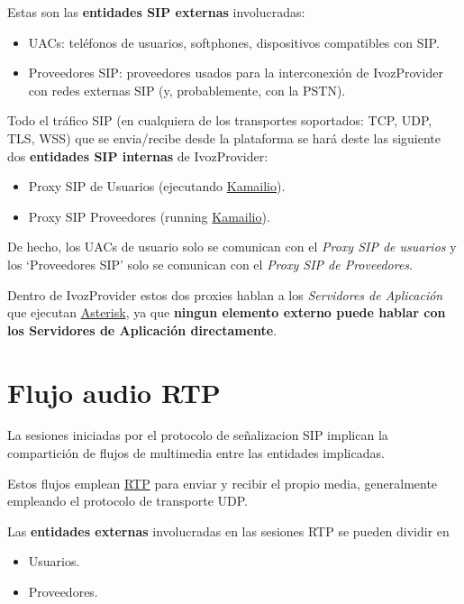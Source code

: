 \documentclass[letterpaper,10pt,spanish]{sphinxmanual}
\begin{document}
Estas son las \textbf{entidades SIP externas} involucradas:
\begin{itemize}
\item {} 
UACs: teléfonos de usuarios, softphones, dispositivos compatibles con SIP.

\item {} 
Proveedores SIP: proveedores usados para la interconexión de IvozProvider con redes externas SIP (y, probablemente, con la PSTN).

\end{itemize}

Todo el tráfico SIP (en cualquiera de los transportes soportados: TCP, UDP, TLS, WSS) que se envia/recibe desde la plataforma se hará deste las siguiente dos \textbf{entidades SIP internas} de IvozProvider:
\begin{itemize}
\item {} 
Proxy SIP de Usuarios (ejecutando \href{https://www.kamailio.org}{Kamailio}).

\item {} 
Proxy SIP Proveedores (running \href{https://www.kamailio.org}{Kamailio}).

\end{itemize}

De hecho, los UACs de usuario solo se comunican con el \emph{Proxy SIP de usuarios} y los `Proveedores SIP' solo se comunican con el \emph{Proxy SIP de Proveedores}.

Dentro de IvozProvider estos dos proxies hablan a los \emph{Servidores de Aplicación} que ejecutan \href{http://www.asterisk.org/}{Asterisk}, ya que \textbf{ningun elemento externo puede hablar con los Servidores de Aplicación directamente}.


\section{Flujo audio RTP}
\label{architecture/index:rtp-audio-flow}\label{architecture/index:audioflow}
La sesiones iniciadas por el protocolo de señalizacion SIP implican la compartición de flujos de multimedia entre las entidades implicadas.

Estos flujos emplean \href{https://tools.ietf.org/html/rfc3550}{RTP} para enviar y recibir el propio media, generalmente empleando el protocolo de transporte UDP.

Las \textbf{entidades externas} involucradas en las sesiones RTP se pueden dividir en
\begin{itemize}
\item {} 
Usuarios.

\item {} 
Proveedores.

\end{itemize}
\end{document}
